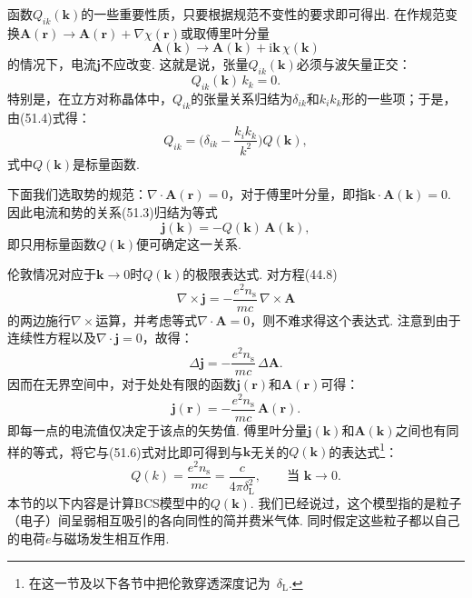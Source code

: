 函数$Q_{ik}(\bm{k})$的一些重要性质，只要根据规范不变性的要求即可得出. 在作规范变换$\bm{A}(\bm{r})\to\bm{A}(\bm{r})+\nabla\chi(\bm{r})$或取傅里叶分量
\begin{equation*}
\bm{A}(\bm{k})\to\bm{A}(\bm{k})+\mathrm{i}\bm{k}\,\chi(\bm{k})
\end{equation*}
的情况下，电流$\bm{j}$不应改变. 这就是说，张量$Q_{ik}(\bm{k})$必须与波矢量正交：
\begin{equation}
Q_{ik}(\bm{k})\,k_k=0.
\end{equation}
特别是，在立方对称晶体中，$Q_{ik}$的张量关系归结为$\delta_{ik}$和$k_ik_k$形的一些项；于是，由(51.4)式得：
\begin{equation}
Q_{ik}=\biggl(\delta_{ik}-\frac{k_ik_k}{k^2}\biggr)Q(\bm{k}),
\end{equation}
式中$Q(\bm{k})$是标量函数.

下面我们选取势的规范：$\nabla\cdot\bm{A}(\bm{r})=0$，对于傅里叶分量，即指$\bm{k}\cdot\bm{A}(\bm{k})=0$. 因此电流和势的关系(51.3)归结为等式
\begin{equation}
\bm{j}(\bm{k})=-Q(\bm{k})\,\bm{A}(\bm{k}),
\end{equation}
即只用标量函数$Q(\bm{k})$便可确定这一关系.

伦敦情况对应于$\bm{k}\to0$时$Q(\bm{k})$的极限表达式. 对方程(44.8)
\begin{equation*}
\nabla\times\bm{j}=-\frac{e^2n_{\mathrm{s}}}{mc}\,\nabla\times\bm{A}
\end{equation*}
的两边施行$\nabla\times$运算，并考虑等式$\nabla\cdot\bm{A}=0$，则不难求得这个表达式. 注意到由于连续性方程以及$\nabla\cdot\bm{j}=0$，故得：
\begin{equation*}
\Delta\bm{j}=-\frac{e^2n_{\mathrm{s}}}{mc}\,\Delta\bm{A}.
\end{equation*}
因而在无界空间中，对于处处有限的函数$\bm{j}(\bm{r})$和$\bm{A}(\bm{r})$可得：
\begin{equation}
\bm{j}(\bm{r})=-\frac{e^2n_{\mathrm{s}}}{mc}\,\bm{A}(\bm{r}).
\end{equation}
即每一点的电流值仅决定于该点的矢势值. 傅里叶分量$\bm{j}(\bm{k})$和$\bm{A}(\bm{k})$之间也有同样的等式，将它与(51.6)式对比即可得到与$\bm{k}$无关的$Q(\bm{k})$的表达式\footnote{在这一节及以下各节中把伦敦穿透深度记为~$\delta_{\mathrm{L}}$.}：
\begin{equation}
Q(k)=\frac{e^2n_{\mathrm{s}}}{mc}=\frac{c}{4\pi\delta_{\mathrm{L}}^2},
\qquad \text{当 }\bm{k}\to0.
\end{equation}
本节的以下内容是计算BCS模型中的$Q(\bm{k})$. 我们已经说过，这个模型指的是粒子（电子）间呈弱相互吸引的各向同性的简并费米气体. 同时假定这些粒子都以自己的电荷$e$与磁场发生相互作用.

